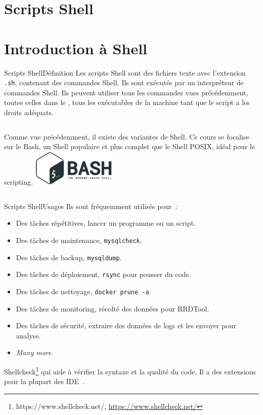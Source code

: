 \documentclass{beamer}
\begin{document}
    \section{Scripts Shell}\label{sec:scripting-shell}


    \section{Introduction à Shell}\label{sec:shell-introduction}
    \begin{frame}{Scripts Shell}{Définition}
        Les scripts Shell sont des fichiers texte avec l'extension \lstinline{.sh}, contenant des commandes Shell.
        Ils sont exécutés par un interpréteur de commandes Shell.
        \bigbreak
        Ils peuvent utiliser tous les commandes vues précédemment, toutes celles dans le , tous les exécutables de la machine tant que le script a les droits adéquats.
        \bigbreak
        \begin{columns}
            Comme vue précédemment, il existe des variantes de Shell.
            Ce cours se focalise sur le Bash, un Shell populaire et plus complet que le Shell POSIX, idéal pour le scripting.
            \centering
            \includegraphics[width=4cm]{image/bash-logo}
        \end{columns}
    \end{frame}

    \begin{frame}{Scripts Shell}{Usages}
        Ils sont fréquemment utilisés pour~:
        \begin{itemize}
            \item Des tâches répétitives, lancer un programme ou un script.
            \item Des tâches de maintenance, \lstinline{mysqlcheck}.
            \item Des tâches de backup, \lstinline{mysqldump}.
            \item Des tâches de déploiement, \lstinline{rsync} pour pousser du code.
            \item Des tâches de nettoyage, \lstinline{docker prune -a}.
            \item Des tâches de monitoring, récolté des données pour RRDTool.
            \item Des tâches de sécurité, extraire des données de logs et les envoyer pour analyse.
            \item \textit{Many more}.
        \end{itemize}
        Shellcheck\footnote{https://www.shellcheck.net/, \url{https://www.shellcheck.net/}} qui aide à vérifier la syntaxe et la qualité du code.
        Il a des extensions pour la plupart des IDE~.
    \end{frame}
\end{document}
